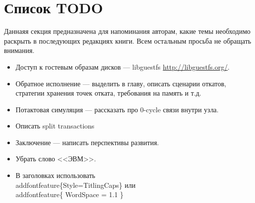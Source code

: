 \section*{Список TODO}

Даннаяя секция предназначена для напоминания авторам, какие темы необходимо раскрыть в последующих редакциях книги. Всем остальным просьба не обращать внимания.

\begin{itemize}
    \item Доступ к гостевым образам дисков --- libguestfs \url{http://libguestfs.org/}.
    \item Обратное исполнение --- выделить в главу, описать сценарии откатов, стратегии хранения точек отката, требования на память и т.д.
    \item Потактовая симуляция --- рассказать про 0-cycle связи внутри узла.
    \item Описать split transactions
    \item Заключение --- написать перспективы развития.
    \item Убрать слово <<ЭВМ>>.
    \item В заголовках использовать \\addfontfeature\{Style=TitlingCaps\} или \\addfontfeature\{ WordSpace = 1.1 \}

\end{itemize}
